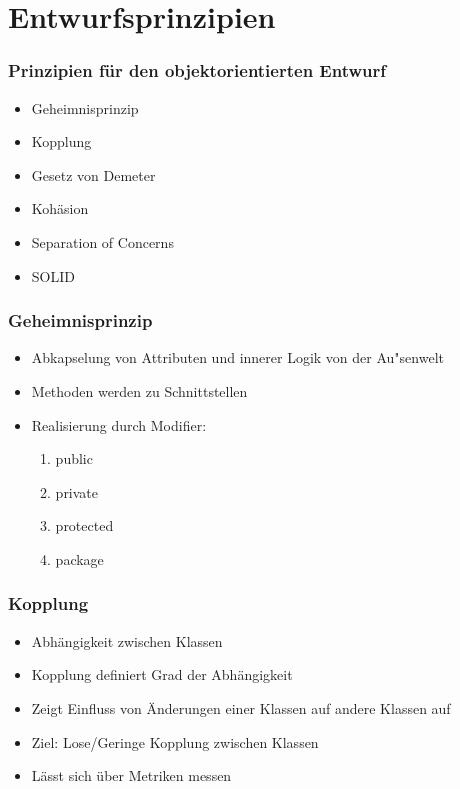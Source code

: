 
\section{Entwurfsprinzipien}
\begin{frame}
\frametitle{Prinzipien f\"ur den objektorientierten Entwurf}
	\begin{itemize}
	  \item Geheimnisprinzip
	  \item Kopplung
	  \item Gesetz von Demeter
	  \item Koh\"asion
	  \item Separation of Concerns
	  \item SOLID
	\end{itemize}
\end{frame}

\begin{frame}[fragile]
	\frametitle{Geheimnisprinzip}
	\begin{itemize}
	  \item Abkapselung von Attributen und innerer Logik von
	  der Au"senwelt
	  \item Methoden werden zu Schnittstellen
	  \item Realisierung durch Modifier:
	  \begin{enumerate}
	    \item public
	    \item private
	    \item protected
	    \item package
	  \end{enumerate}
	\end{itemize}
\end{frame} 

\begin{frame}[fragile]
	\frametitle{Kopplung}
		\begin{itemize}
		  \item Abh\"angigkeit zwischen Klassen
		  \item Kopplung definiert Grad der Abh\"angigkeit
		  \item Zeigt Einfluss von \"Anderungen einer Klassen
		  auf andere Klassen auf
		  \item Ziel: Lose/Geringe Kopplung zwischen Klassen
		  \item L\"asst sich \"uber Metriken messen
		\end{itemize}
\end{frame} 

